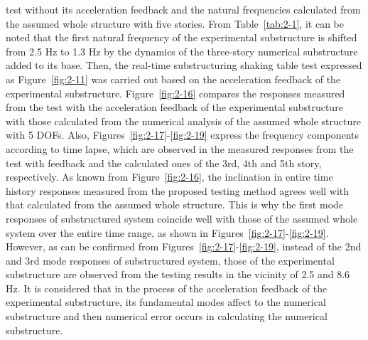 test without its acceleration feedback and the natural frequencies calculated from the assumed whole structure with five stories. From Table~\ref{tab:2-1}, it can be noted that the first natural frequency of the experimental substructure is shifted from 2.5 Hz to 1.3 Hz by the dynamics of the three-story numerical substructure added to its base.
 Then, the real-time substructuring shaking table test expressed as Figure~\ref{fig:2-11} was carried out based on the acceleration feedback of the experimental substructure. Figure~\ref{fig:2-16} compares the responses measured from the test with the acceleration feedback of the experimental substructure with those calculated from the numerical analysis of the assumed whole structure with 5 DOFs. Also, Figures~\ref{fig:2-17}-\ref{fig:2-19} express the frequency components according to time lapse, which are observed in the measured responses from the test with feedback and the calculated ones of the 3rd, 4th and 5th story, respectively. As known from Figure~\ref{fig:2-16}, the inclination in entire time history responses measured from the proposed testing method agrees well with that calculated from the assumed whole structure. This is why the first mode responses of substructured system coincide well with those of the assumed whole system over the entire time range, as shown in Figures~\ref{fig:2-17}-\ref{fig:2-19}. However, as can be confirmed from Figures~\ref{fig:2-17}-\ref{fig:2-19}, instead of the 2nd and 3rd mode responses of substructured system, those of the experimental substructure are observed from the testing results in the vicinity of 2.5 and 8.6 Hz. It is considered that in the process of the acceleration feedback of the experimental substructure, its fundamental modes affect to the numerical substructure and then numerical error occurs in calculating the numerical substructure.


